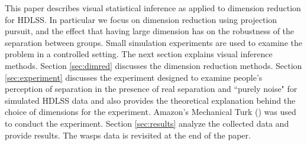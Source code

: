





This paper describes visual statistical inference as applied to dimension reduction for HDLSS. In particular we focus on dimension reduction using projection pursuit, and the effect that having large dimension has on the robustness of the separation between groups.  Small simulation experiments are used to examine the problem in a controlled setting. The next section explains visual inference methods. Section \ref{sec:dimred} discusses the dimension reduction methods. Section \ref{sec:experiment} discusses the experiment designed to examine people's perception of separation in the presence of real separation and ``purely noise" for simulated HDLSS data and also provides the theoretical explanation behind the choice of dimensions for the experiment. Amazon's Mechanical Turk (\cite{turk}) was used to conduct the experiment. Section \ref{sec:results} analyze the collected data and provide results. The wasps data is revisited at the end of the paper. 


